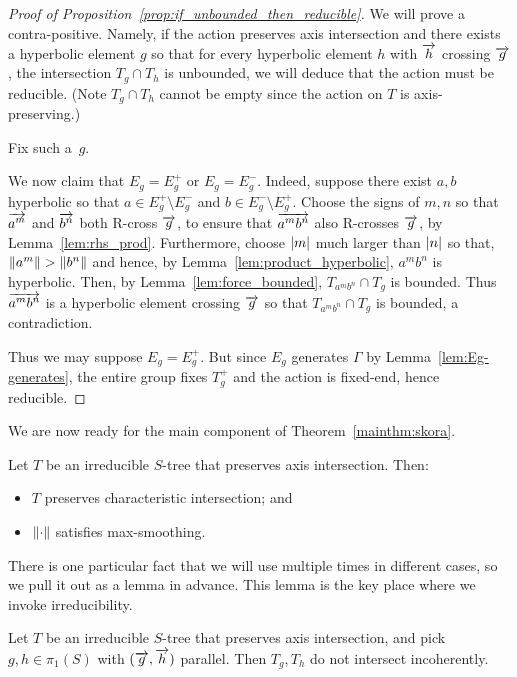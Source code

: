 \begin{proof}[Proof of Proposition~\ref{prop:if_unbounded_then_reducible}]
    We will prove a contra-positive. Namely, if the action preserves
    axis intersection and there exists a hyperbolic
    element $g$ so that for every hyperbolic element $h$ with $\overrightarrow{h}$ crossing
    $\overrightarrow{g}$, the intersection $T_g \cap T_h$ is unbounded, we will deduce
    that the action must be reducible. (Note $T_g \cap T_h$ cannot be
    empty since the action on $T$ is axis-preserving.)
    
    Fix such a~$g$.

We now claim that $E_g = E_g^+$ or $E_g = E_g^-$.
Indeed, suppose there exist $a,b$ hyperbolic so that
$a \in E_g^+ \setminus E_g^-$ and $b \in E_g^- \setminus E_g^+$.
Choose the signs of $m,n$ so that
$\overrightarrow{a^m}$ and $\overrightarrow{b^n}$ both R-cross $\overrightarrow{g}$,
to ensure that $\overrightarrow{a^m b^n}$ also R-crosses $\overrightarrow{g}$, by Lemma~\ref{lem:rhs_prod}.
Furthermore, choose $\lvert m\rvert$ much larger than $\lvert n\rvert$ so that,
$\lVert a^m\rVert >\lVert b^n\rVert$ and hence, by Lemma~\ref{lem:product_hyperbolic},
$a^m b^n$ is hyperbolic.
Then, by Lemma~\ref{lem:force_bounded}, $T_{a^m b^n} \cap T_g$ is bounded. Thus $\overrightarrow{a^m b^n}$ is a hyperbolic element crossing $\overrightarrow{g}$ so that $T_{a^m b^n} \cap T_g$ is bounded, a contradiction. 

Thus we may suppose $E_g = E_g^+$. But since $E_g$ generates $\Gamma$
by Lemma~\ref{lem:Eg-generates}, the entire group fixes $T_g^+$ and
the action is fixed-end, hence reducible.
    \end{proof}
    
We are now ready for the main component of Theorem~\ref{mainthm:skora}.

\begin{theorem}
Let $T$ be an irreducible $S$-tree that preserves axis
intersection. Then:
\begin{itemize}
\item $T$ preserves characteristic intersection; and
\item $\lVert \cdot \rVert$ satisfies max-smoothing. 
\end{itemize}
\label{thm:small}
\end{theorem}

There is one particular fact that we will use multiple times in
different cases, so we pull it out as a lemma in advance. This lemma
is the key place where we invoke irreducibility.

\begin{proposition}\label{prop:parallel-incoherent}
  Let $T$ be an irreducible $S$-tree that preserves axis
  intersection, and pick $g,h \in \pi_1(S)$ with
  $(\overrightarrow{g},\overrightarrow{h})$ parallel. Then $T_g,T_h$ do not intersect incoherently.
\end{proposition}


